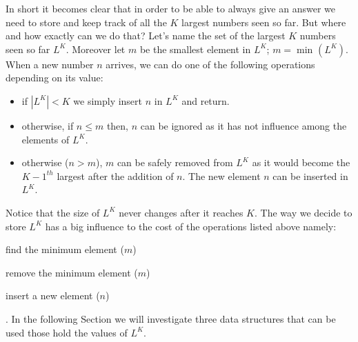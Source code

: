 In short it becomes clear that in order to be able to always give an answer we need to store and
keep track of all the $K$ largest numbers seen so far. But where and how exactly can we do that?
Let's name the set of the largest $K$ numbers seen so far $L^K$. Moreover let $m$ be the smallest
element in $L^K$; $m = \min_{} (L^K)$. When a new number $n$ arrives, we can do one of the following
operations depending on its value:
\begin{itemize}
	\item if $|L^K| < K$  we simply insert $n$ in $L^K$ and return.
	\item otherwise, if $n \leq m$ then, $n$ can be ignored as it has not influence among the
	elements of $L^K$.
	\item otherwise ($n > m$), $m$ can be safely removed from $L^K$ as it would become the
	$K-1^{th}$ largest after the addition of $n$. The new element $n$ can be inserted in $L^K$.
\end{itemize}
Notice that the size of $L^K$ never changes after it reaches $K$. The way we decide to store $L^K$
has a big influence to the cost of the operations listed above namely: 
\begin{enumerate*}
	\item find the minimum element ($m$)
	\item remove the minimum element ($m$)
	\item insert a new element ($n$) \end{enumerate*}. In the following Section we will investigate
three data structures that can be used those hold the values of $L^K$. 

